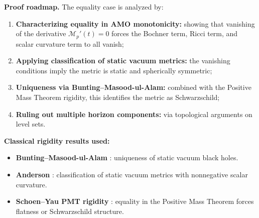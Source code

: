 \noindent\textbf{Proof roadmap.} The equality case is analyzed by:
\begin{enumerate}
    \item[(i)] \textbf{Characterizing equality in AMO monotonicity:} showing that vanishing of the derivative $\mathcal{M}_p'(t) = 0$ forces the Bochner term, Ricci term, and scalar curvature term to all vanish;
    \item[(ii)] \textbf{Applying classification of static vacuum metrics:} the vanishing conditions imply the metric is static and spherically symmetric;
    \item[(iii)] \textbf{Uniqueness via Bunting--Masood-ul-Alam:} combined with the Positive Mass Theorem rigidity, this identifies the metric as Schwarzschild;
    \item[(iv)] \textbf{Ruling out multiple horizon components:} via topological arguments on level sets.
\end{enumerate}
\textbf{Classical rigidity results used:}
\begin{itemize}
    \item \textbf{Bunting--Masood-ul-Alam} \cite{buntingmasood1987}: uniqueness of static vacuum black holes.
    \item \textbf{Anderson} \cite{anderson2000}: classification of static vacuum metrics with nonnegative scalar curvature.
    \item \textbf{Schoen--Yau PMT rigidity} \cite{schoen1981}: equality in the Positive Mass Theorem forces flatness or Schwarzschild structure.
\end{itemize}

